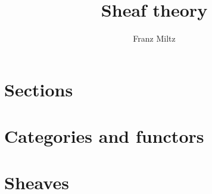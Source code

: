 \documentclass{article}
\author{Franz Miltz}
\title{Sheaf theory}
\begin{document}
\maketitle
\tableofcontents
\pagebreak

\printbibliography

\section{Sections}\label{sec:sections}

\begin{definition}
  \missingdef
\end{definition}

\missingexample

\section{Categories and functors}\label{sec:categories_and_functors}

\begin{definition}[Category]\label{def:category}
  \missingdef
\end{definition}

\begin{definition}[Functor]\label{def:functor}
  \missingdef
\end{definition}

\section{Sheaves}\label{sec:sheaves}

\begin{definition}[Sheaf]
  \missingdef
\end{definition}

\begin{definition}
  \missingdef
\end{definition}

\begin{definition}
  \missingdef
\end{definition}
\end{document}
